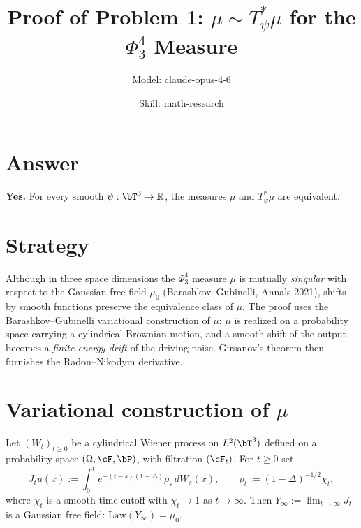

\title{Proof of Problem 1: $\mu \sim T_\psi^*\mu$ for the $\Phi^4_3$ Measure}
\author{Model: claude-opus-4-6 \and Skill: math-research}
\date{}

\newtheorem{theorem}{Theorem}
\newtheorem{lemma}[theorem]{Lemma}
\newtheorem{proposition}[theorem]{Proposition}


\maketitle

\section*{Answer}

\textbf{Yes.} For every smooth $\psi:\bT^3 \to \bR$, the measures $\mu$ and $T_\psi^*\mu$ are equivalent.

\section{Strategy}

Although in three space dimensions the $\Phi^4_3$ measure $\mu$ is mutually \emph{singular} with respect to the Gaussian free field $\mu_0$ (Barashkov--Gubinelli, Annals 2021), shifts by smooth functions preserve the equivalence class of $\mu$. The proof uses the Barashkov--Gubinelli variational construction of $\mu$: $\mu$ is realized on a probability space carrying a cylindrical Brownian motion, and a smooth shift of the output becomes a \emph{finite-energy drift} of the driving noise. Girsanov's theorem then furnishes the Radon--Nikodym derivative.

\section{Variational construction of $\mu$}

Let $(W_t)_{t\geq 0}$ be a cylindrical Wiener process on $L^2(\bT^3)$ defined on a probability space $(\Omega,\cF,\bP)$, with filtration $(\cF_t)$. For $t\geq 0$ set
\[
   J_t u(x) := \int_0^t e^{-(t-s)(1-\Delta)}\rho_s\, dW_s(x),\qquad \rho_t := (1-\Delta)^{-1/2}\chi_t,
\]
where $\chi_t$ is a smooth time cutoff with $\chi_t \to 1$ as $t\to\infty$. Then $Y_\infty := \lim_{t\to\infty} J_t$ is a Gaussian free field: $\mathrm{Law}(Y_\infty)=\mu_0$.

